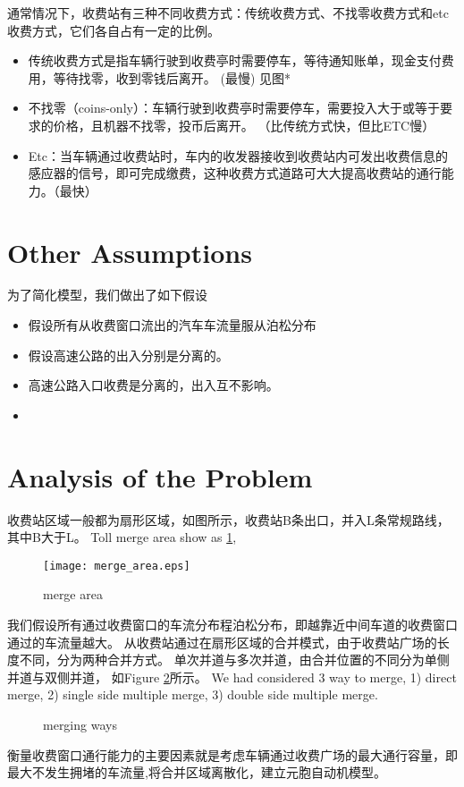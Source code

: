 \documentclass{mcmthesis}
\begin{document}
通常情况下，收费站有三种不同收费方式：传统收费方式、不找零收费方式和etc收费方式，它们各自占有一定的比例。
\begin{itemize}
	\item 传统收费方式是指车辆行驶到收费亭时需要停车，等待通知账单，现金支付费用，等待找零，收到零钱后离开。  (最慢) 见图*
	\item  不找零（coins-only）：车辆行驶到收费亭时需要停车，需要投入大于或等于要求的价格，且机器不找零，投币后离开。  （比传统方式快，但比ETC慢）
	\item Etc：当车辆通过收费站时，车内的收发器接收到收费站内可发出收费信息的感应器的信号，即可完成缴费，这种收费方式道路可大大提高收费站的通行能力。（最快）
\end{itemize}


\section{Other Assumptions}
为了简化模型，我们做出了如下假设
\begin{itemize}
\item 假设所有从收费窗口流出的汽车车流量服从泊松分布
\item 假设高速公路的出入分别是分离的。
\item 高速公路入口收费是分离的，出入互不影响。
\item
\end{itemize}

\section{Analysis of the Problem}
收费站区域一般都为扇形区域，如图所示，收费站B条出口，并入L条常规路线，其中B大于L。
Toll merge area show as \ref{fig:merge_area},\cite{woo1991toll}
\begin{figure}[!h]
	\centering
	\texttt{[image: merge\_area.eps]}
	\caption{\label{fig:merge_area}merge area}
\end{figure}
我们假设所有通过收费窗口的车流分布程泊松分布，即越靠近中间车道的收费窗口通过的车流量越大。
从收费站通过在扇形区域的合并模式，由于收费站广场的长度不同，分为两种合并方式。
单次并道与多次并道，由合并位置的不同分为单侧并道与双侧并道，
如Figure \ref{fig:merge_ways}所示。
We had considered 3 way to merge, 1) direct merge, 2) single side multiple merge, 3) double side multiple merge.
\begin{figure}[!htbp]
	\centering
	\caption{\label{fig:merge_ways}merging ways}
\end{figure}
衡量收费窗口通行能力的主要因素就是考虑车辆通过收费广场的最大通行容量，即最大不发生拥堵的车流量,将合并区域离散化，建立元胞自动机模型。
\end{document}

